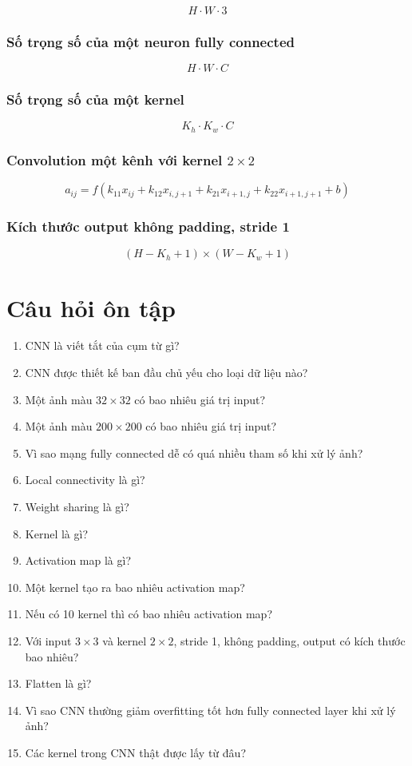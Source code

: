 \documentclass[12pt,a4paper]{report}
\begin{document}
\[
    H \cdot W \cdot 3
\]

\subsection*{Số trọng số của một neuron fully connected}

\[
    H \cdot W \cdot C
\]

\subsection*{Số trọng số của một kernel}

\[
    K_h \cdot K_w \cdot C
\]

\subsection*{Convolution một kênh với kernel $2\times2$}

\[
    a_{ij}
    =
    f(
    k_{11}x_{ij}
    +
    k_{12}x_{i,j+1}
    +
    k_{21}x_{i+1,j}
    +
    k_{22}x_{i+1,j+1}
    +
    b
    )
\]

\subsection*{Kích thước output không padding, stride 1}

\[
    (H-K_h+1)\times(W-K_w+1)
\]

\chapter{Câu hỏi ôn tập}

\begin{enumerate}
    \item CNN là viết tắt của cụm từ gì?
    \item CNN được thiết kế ban đầu chủ yếu cho loại dữ liệu nào?
    \item Một ảnh màu $32\times32$ có bao nhiêu giá trị input?
    \item Một ảnh màu $200\times200$ có bao nhiêu giá trị input?
    \item Vì sao mạng fully connected dễ có quá nhiều tham số khi xử lý ảnh?
    \item Local connectivity là gì?
    \item Weight sharing là gì?
    \item Kernel là gì?
    \item Activation map là gì?
    \item Một kernel tạo ra bao nhiêu activation map?
    \item Nếu có 10 kernel thì có bao nhiêu activation map?
    \item Với input $3\times3$ và kernel $2\times2$, stride 1, không padding, output có kích thước bao nhiêu?
    \item Flatten là gì?
    \item Vì sao CNN thường giảm overfitting tốt hơn fully connected layer khi xử lý ảnh?
    \item Các kernel trong CNN thật được lấy từ đâu?
\end{enumerate}
\end{document}
